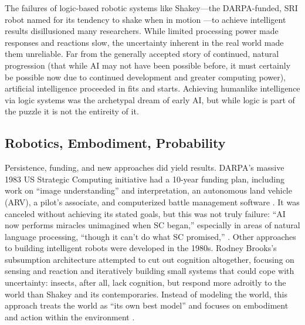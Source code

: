 The failures of logic-based robotic systems like Shakey---the
DARPA-funded, SRI
robot named for its tendency to shake when in motion \cite[Ch.
  10]{mccorduck}---to achieve intelligent results disillusioned many
researchers. While limited processing power made responses and reactions slow, the
uncertainty inherent in the real world made them unreliable. Far from
the generally accepted story of continued, natural 
progression (that while AI may not have been possible before, it must
certainly be possible now due to continued development and greater
computing power), artificial intelligence proceeded in fits and
starts. Achieving humanlike intelligence via logic 
systems was the archetypal dream of early AI, but while logic is
part of the puzzle it is not the entireity of it.

\subsection{Robotics, Embodiment, Probability}

Persistence, funding, and new approaches did yield results.
DARPA's massive 1983 US Strategic Computing initiative had a 10-year
funding plan, including work on ``image understanding'' and
interpretation, an autonomous land vehicle (ARV), a pilot's associate,
and computerized battle management software \cite{rolandShiman}. It
was canceled without 
achieving its stated goals, but this was not truly failure: ``AI now
performs miracles unimagined when SC 
began,'' especially in areas of natural language processing, ``though
it can't do what SC promised,'' \cite[p. 328]{rolandShiman}. Other
approaches to building intelligent robots were developed in the 1980s. Rodney 
Brooks's subsumption architecture \cite[p.
  353]{mobilebrooks} attempted to cut out 
cognition altogether, focusing on sensing and reaction and iteratively
building small systems that could cope with uncertainty:
insects, after all, lack cognition, but respond more adroitly to the
world than Shakey and its contemporaries. Instead of modeling the
world, this approach treats
the world as ``its own best model'' and focuses on embodiment and action
within the environment \cite[p. 256]{ekbia}.

